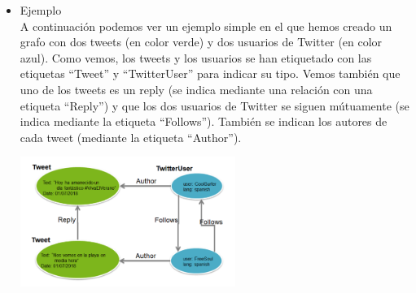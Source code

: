 \documentclass[twoside,twocolumn]{article}
\begin{document}
\begin{itemize}
\item Ejemplo
\\ A continuación podemos ver un ejemplo simple en el que hemos creado un grafo con dos tweets (en color verde) y dos usuarios de Twitter (en color azul). Como vemos, los tweets y los usuarios se han etiquetado con las etiquetas “Tweet” y “TwitterUser” para indicar su tipo. Vemos también que uno de los tweets es un reply (se indica mediante una relación con una etiqueta “Reply”) y que los dos usuarios de Twitter se siguen mútuamente (se indica mediante la etiqueta “Follows”). También se indican los autores de cada tweet (mediante la etiqueta “Author”).


\begin{center}
	\includegraphics[width=7cm]{./Imagenes/tweet} 
\end{center}

\end{itemize} 
\end{document}
